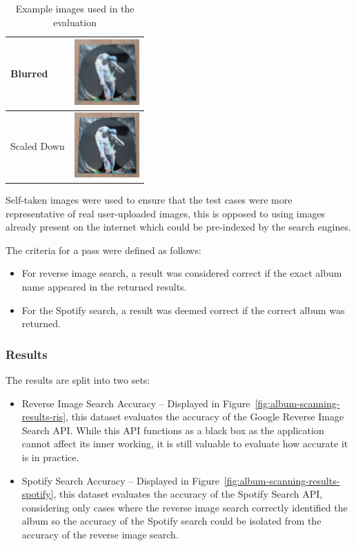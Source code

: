 \begin{table} [H]
\begin{subtable}{0.48\textwidth}
\begin{tabular}{|m{2.5cm}|m{2.5cm}|}
            \hline
            Blurred & \includegraphics[width=2.5cm]{figures/test_albums/Reflektor_Blurred.jpg} \\
            \hline
            Scaled Down & \includegraphics[width=2.5cm]{figures/test_albums/Reflektor_Scaled.jpg} \\
            \hline
        \end{tabular}
    \end{subtable}

    \caption{Example images used in the evaluation}
    \label{tab:image-evaluation-examples}
\end{table}

Self-taken images were used to ensure that the test cases were more representative of real user-uploaded images, this is opposed to using images already present on the internet which could be pre-indexed by the search engines.

The criteria for a pass were defined as follows:
\begin{itemize}
    \item For reverse image search, a result was considered correct if the exact album name appeared in the returned results.
    \item For the Spotify search, a result was deemed correct if the correct album was returned.
\end{itemize}

\subsubsection{Results}
The results are split into two sets:
\begin{itemize}
    \item Reverse Image Search Accuracy – Displayed in Figure~\ref{fig:album-scanning-results-ris}, this dataset evaluates the accuracy of the Google Reverse Image Search API. While this API functions as a black box as the application cannot affect its inner working, it is still valuable to evaluate how accurate it is in practice.
    \item Spotify Search Accuracy – Displayed in Figure~\ref{fig:album-scanning-results-spotify}, this dataset evaluates the accuracy of the Spotify Search API, considering only cases where the reverse image search correctly identified the album so the accuracy of the Spotify search could be isolated from the accuracy of the reverse image search.
\end{itemize}

